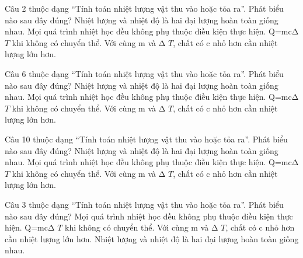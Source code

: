 \begin{ex}
Câu 2 thuộc dạng “Tính toán nhiệt lượng vật thu vào hoặc tỏa ra”. Phát biểu nào sau đây đúng?
\choice
{Nhiệt lượng và nhiệt độ là hai đại lượng hoàn toàn giống nhau.}
{Mọi quá trình nhiệt học đều không phụ thuộc điều kiện thực hiện.}
{\True Q=mcΔ $T$ khi không có chuyển thể.}
{Với cùng m và Δ $T$, chất có c nhỏ hơn cần nhiệt lượng lớn hơn.}
\end{ex}

\begin{ex}
Câu 6 thuộc dạng “Tính toán nhiệt lượng vật thu vào hoặc tỏa ra”. Phát biểu nào sau đây đúng?
\choice
{Nhiệt lượng và nhiệt độ là hai đại lượng hoàn toàn giống nhau.}
{Mọi quá trình nhiệt học đều không phụ thuộc điều kiện thực hiện.}
{\True Q=mcΔ $T$ khi không có chuyển thể.}
{Với cùng m và Δ $T$, chất có c nhỏ hơn cần nhiệt lượng lớn hơn.}
\end{ex}

\begin{ex}
Câu 10 thuộc dạng “Tính toán nhiệt lượng vật thu vào hoặc tỏa ra”. Phát biểu nào sau đây đúng?
\choice
{Nhiệt lượng và nhiệt độ là hai đại lượng hoàn toàn giống nhau.}
{Mọi quá trình nhiệt học đều không phụ thuộc điều kiện thực hiện.}
{\True Q=mcΔ $T$ khi không có chuyển thể.}
{Với cùng m và Δ $T$, chất có c nhỏ hơn cần nhiệt lượng lớn hơn.}
\end{ex}

\begin{ex}
Câu 3 thuộc dạng “Tính toán nhiệt lượng vật thu vào hoặc tỏa ra”. Phát biểu nào sau đây đúng?
\choice
{Mọi quá trình nhiệt học đều không phụ thuộc điều kiện thực hiện.}
{\True Q=mcΔ $T$ khi không có chuyển thể.}
{Với cùng m và Δ $T$, chất có c nhỏ hơn cần nhiệt lượng lớn hơn.}
{Nhiệt lượng và nhiệt độ là hai đại lượng hoàn toàn giống nhau.}
\end{ex}

